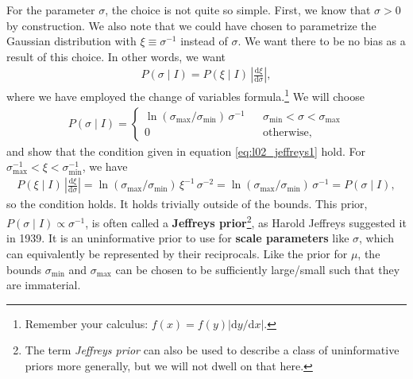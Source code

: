 For the parameter $\sigma$, the choice is not quite so simple.  First,
we know that $\sigma > 0$ by construction.  We also note that we could
have chosen to parametrize the Gaussian distribution with
$\xi \equiv \sigma^{-1}$ instead of $\sigma$.  We want there to be no
bias as a result of this choice.  In other words, we want
\begin{align}
P(\sigma\mid I) = P(\xi \mid I) \, \left|\frac{\mathrm{d}\xi}{\mathrm{d}\sigma}\right|,
\label{eq:l02_jeffreys1}
\end{align}
where we have employed the change of variables
formula.\footnote{Remember your calculus: $f(x) =
  f(y)\left|\mathrm{d}y/\mathrm{d}x\right|$.}  We will choose
\begin{align}
  P(\sigma \mid I) =  \left\{\begin{array}{ccl}
\ln(\sigma_\mathrm{max} / \sigma_\mathrm{min})\,\sigma^{-1} & & \sigma_\mathrm{min} < \sigma < \sigma_\mathrm{max}\\[1em]
0 & & \text{otherwise},
\end{array}\right.
\end{align}
and show that the condition given in equation \eqref{eq:l02_jeffreys1}
hold.  For $\sigma_\mathrm{max}^{-1} < \xi < \sigma_\mathrm{min}^{-1}$, we
have
\begin{align}
P(\xi \mid I) \, \left|\frac{\mathrm{d}\xi}{\mathrm{d}\sigma}\right|
= \ln(\sigma_\mathrm{max} / \sigma_\mathrm{min})\,\xi^{-1} \, \sigma^{-2}
=  \ln(\sigma_\mathrm{max} / \sigma_\mathrm{min})\,\sigma^{-1}
= P(\sigma\mid I),
\end{align}
so the condition holds.  It holds trivially outside of the bounds.
This prior, $P(\sigma\mid I) \propto \sigma^{-1}$, is often called a
\textbf{Jeffreys prior}\footnote{The term \textit{Jeffreys prior} can also be used to describe a class of uninformative priors more generally, but we will not dwell on that here.}, as Harold Jeffreys suggested it in 1939.  It is an uninformative prior to use for
\textbf{scale parameters} like $\sigma$, which can equivalently be
represented by their reciprocals.  Like the prior for $\mu$, the
bounds $\sigma_\mathrm{min}$ and $\sigma_\mathrm{max}$ can be chosen
to be sufficiently large/small such that they are immaterial.

